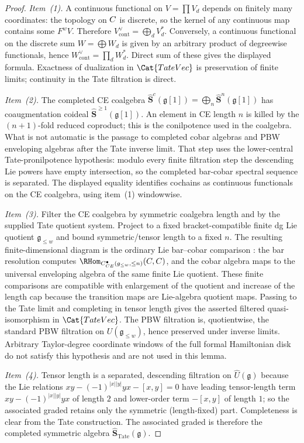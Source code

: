 \documentclass[11pt]{memoir}
\begin{document}
\begin{proof}
  \emph{Item~(1).} A continuous functional on $V=\prod V_d$ depends on
  finitely many coordinates: the topology on $C$ is discrete, so the
  kernel of any continuous map contains some $F^w V$. Therefore
  $V^\vee_{\mathrm{cont}}=\bigoplus_d V_d^*$. Conversely, a continuous
  functional on the discrete sum $W=\bigoplus W_d$ is given by an
  arbitrary product of degreewise functionals, hence
  $W^\vee_{\mathrm{cont}}=\prod_d W_d^*$. Direct sum of these gives the
  displayed formula. Exactness of dualization in $\Cat{TateVec}$ is
  preservation of finite limits; continuity in the Tate filtration is
  direct.

  \emph{Item~(2).} The completed CE coalgebra
  $\widehat{\mathbf S}^c(\mathfrak g[1])=\bigoplus_n
  \widehat{\mathbf S}^n(\mathfrak g[1])$ has coaugmentation coideal
  $\widehat{\mathbf S}^{\geq 1}(\mathfrak g[1])$. An element in CE
  length \(n\) is killed by the \((n+1)\)-fold reduced coproduct; this is
  the conilpotence used in the coalgebra.  What is not automatic is the
  passage to completed cobar algebras and PBW enveloping algebras after
  the Tate inverse limit.  That step uses the lower-central
  Tate-pronilpotence hypothesis: modulo every finite filtration step the
  descending Lie powers have empty intersection, so the completed
  bar-cobar spectral sequence is separated. The displayed equality
  identifies cochains as continuous functionals on the CE coalgebra,
  using item~(1) windowwise.

  \emph{Item~(3).} Filter the CE coalgebra by symmetric coalgebra
  length and by the supplied Tate quotient system. Project to a fixed
  bracket-compatible finite dg Lie quotient \(\mathfrak g_{\leq w}\) and
  bound symmetric/tensor length to a fixed \(n\). The resulting
  finite-dimensional diagram is the ordinary Lie bar--cobar comparison
  \cite{loday-vallette}: the bar resolution computes
  \(\RHom_{C^\bullet_{\mathrm{CE}}(\mathfrak g_{\leq w},\leq n)}(\C,\C)\),
  and the cobar algebra maps to the universal enveloping algebra of the
  same finite Lie quotient. These finite comparisons are compatible with
  enlargement of the quotient and increase of the length cap because the
  transition maps are Lie-algebra quotient maps. Passing to the Tate
  limit and completing in tensor length gives the asserted filtered
  quasi-isomorphism in \(\Cat{TateVec}\). The PBW filtration is,
  quotientwise, the standard PBW filtration on
  \(U(\mathfrak g_{\leq w})\), hence preserved under inverse limits.
  Arbitrary Taylor-degree coordinate windows of the full formal
  Hamiltonian disk do not satisfy this hypothesis and are not used in
  this lemma.

  \emph{Item~(4).} Tensor length is a separated, descending filtration
  on $\widehat U(\mathfrak g)$ because the Lie relations
  $xy-(-1)^{|x||y|}yx-[x,y]=0$ have leading tensor-length term
  $xy-(-1)^{|x||y|}yx$ of length $2$ and lower-order term $-[x,y]$ of
  length $1$; so the associated graded retains only the symmetric
  (length-fixed) part. Completeness is clear from the Tate
  construction. The associated graded is therefore the completed
  symmetric algebra
  $\widehat{\mathbf S}_{\mathrm{Tate}}(\mathfrak g)$.
\end{proof}
\end{document}
